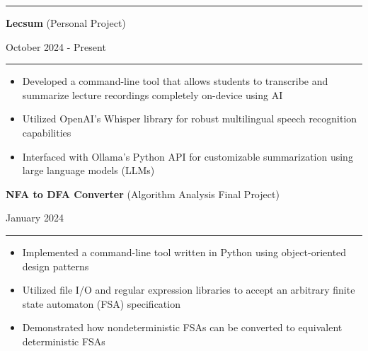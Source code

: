 \documentclass[letter]{article}
\begin{document}
    \medskip
    \vspace{4pt}
    \hrule height 1pt
    \vspace{4pt}

    \noindent
    \begin{minipage}[c]{0.8\linewidth}
        \noindent \textbf{Lecsum} (Personal Project)
    \end{minipage}
    \begin{minipage}[c]{0.19\linewidth}
        \begin{flushright}
            October 2024 - Present
        \end{flushright}
    \end{minipage}
    \vspace{4pt}
    \hrule
    \vspace{4pt}
    \noindent
    \begin{itemize}[noitemsep, topsep=0pt]
        \item Developed a command-line tool that allows students to transcribe and summarize lecture recordings completely on-device using AI
        \item Utilized OpenAI's Whisper library for robust multilingual speech recognition capabilities
        \item Interfaced with Ollama's Python API for customizable summarization using large language models (LLMs)
    \end{itemize}
    \medskip

    \noindent
    \begin{minipage}[c]{0.8\linewidth}
        \noindent \textbf{NFA to DFA Converter} (Algorithm Analysis Final Project)
    \end{minipage}
    \begin{minipage}[c]{0.19\linewidth}
        \begin{flushright}
            January 2024
        \end{flushright}
    \end{minipage}
    \vspace{4pt}
    \hrule
    \vspace{4pt}
    \noindent
    \begin{itemize}[noitemsep, topsep=0pt]
        \item Implemented a command-line tool written in Python using object-oriented design patterns
        \item Utilized file I/O and regular expression libraries to accept an arbitrary finite state automaton (FSA) specification
        \item Demonstrated how nondeterministic FSAs can be converted to equivalent deterministic FSAs
    \end{itemize}
    \medskip
\end{document}
